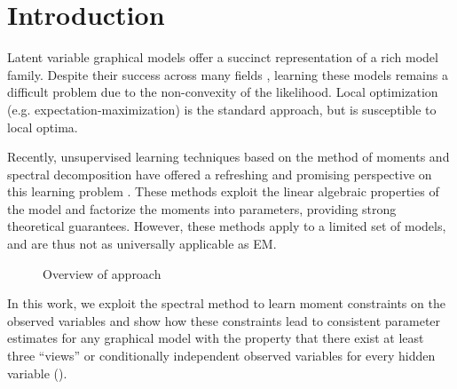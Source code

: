 \section{Introduction}
\label{sec:introduction}

Latent variable graphical models offer a succinct representation of
a rich model family. 
Despite their success across many fields
\cite{quattoni04crf,beaumont2004bayesian,haghighi06prototype,liang06discrimative,kirkpatrick10painless},
learning these models remains a difficult problem due to the
non-convexity of the likelihood. Local optimization (e.g.
expectation-maximization) is the standard approach, but is susceptible
to local optima.

Recently, unsupervised learning techniques based on the method of moments and
spectral decomposition have offered a refreshing and promising perspective on
this learning problem \citep{hsu09spectral,anandkumar11tree,anandkumar12moments,anandkumar12lda,hsu12identifiability,balle11transducer,balle12automata}.
These methods exploit the linear algebraic properties of the model and
factorize the moments into parameters, providing strong theoretical guarantees.
However, these methods apply to a limited set of models, and are thus
not as universally applicable as EM. 

\begin{figure}[t]
  \label{fig:approach}
  \centering
{}
  \caption{Overview of approach}
\end{figure}

In this work, we exploit the spectral method to learn moment constraints
  on the observed variables and show how these constraints lead to consistent parameter estimates 
  for any graphical model with the property that there exist at least
  three ``views'' or conditionally independent observed variables for
  every hidden variable ().

